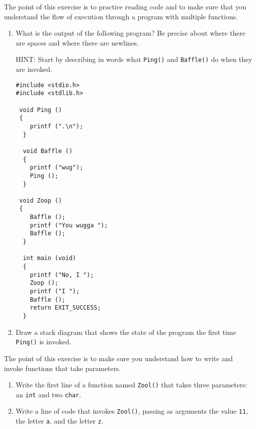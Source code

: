 

\begin{exercise}

The point of this exercise is to practice reading code and to
make sure that you understand the flow of execution through
a program with multiple functions.

\begin{enumerate}

\item What is the output of the following program?  Be precise
about where there are spaces and where there are newlines.

HINT: Start by describing in words what {\tt Ping()} and
{\tt Baffle()} do when they are invoked.

\begin{verbatim}
#include <stdio.h>
#include <stdlib.h>

 void Ping () 
 {
    printf (".\n");
  }

  void Baffle () 
  {
    printf ("wug");
    Ping ();
  }

 void Zoop () 
 {
    Baffle ();    
    printf ("You wugga ");
    Baffle ();
  }

  int main (void) 
  {
    printf ("No, I ");
    Zoop ();
    printf ("I ");
    Baffle ();
    return EXIT_SUCCESS;
  }
\end{verbatim}


\item Draw a stack diagram that shows the state of the program
the first time {\tt Ping()} is invoked.

\end{enumerate}

\end{exercise}


\begin{exercise}
The point of this exercise is to make sure you understand how
to write and invoke functions that take parameters.

\begin{enumerate}

\item Write the first line of a function named {\tt Zool()} that
takes three parameters: an {\tt int} and two {\tt char}.

\item Write a line of code that invokes {\tt Zool()}, passing
as arguments the value {\tt 11}, the letter {\tt a}, and the letter {\tt z}.
\end{enumerate}


\end{exercise}



